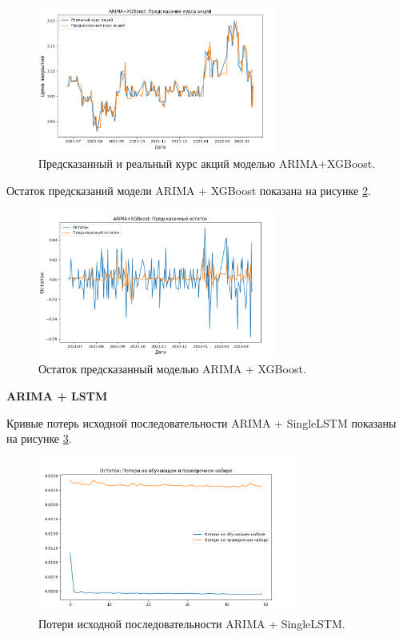 \begin{figure}[hbtp]
  \centering
  \includegraphics[width=0.7\textwidth]{img/arima+xboost2.png}
  \caption{Предсказанный и реальный курс акций моделью ARIMA+XGBoost.}
  \label{fig:arima+xboost2}
\end{figure}

\par Остаток предсказаний модели ARIMA + XGBoost показана на рисунке \ref{fig:arima+xboost}.

\begin{figure}[hbtp]
  \centering
  \includegraphics[width=0.7\textwidth]{img/arima+xboost.png}
  \caption{Остаток предсказанный моделью ARIMA + XGBoost.}
  \label{fig:arima+xboost}
\end{figure}

\newpage
\textbf{ARIMA + LSTM}

\par Кривые потерь исходной последовательности ARIMA + SingleLSTM показаны на рисунке \ref{fig:train-val-loss}.

\begin{figure}[hbtp]
  \centering
  \includegraphics[width=0.75\textwidth]{img/train_val_loss.png}
  \caption{Потери исходной последовательности ARIMA + SingleLSTM.}
  \label{fig:train-val-loss}
\end{figure}

